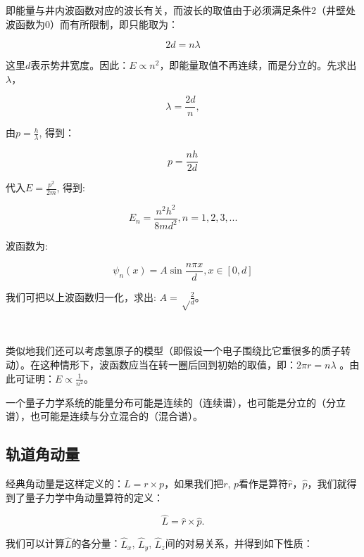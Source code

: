 即能量与井内波函数对应的波长有关，而波长的取值由于必须满足条件2（井壁处波函数为0）而有所限制，即只能取为：

\begin{equation}
2d = n \lambda
\end{equation}

这里$d$表示势井宽度。因此：$E \propto n^2$，即能量取值不再连续，而是分立的。先求出$\lambda$，

\begin{equation}
\lambda = \frac{2d}{n},
\end{equation}

由$p =\frac{h}{\lambda}$, 得到：

\begin{equation}
p = \frac{nh}{2d}
\end{equation}

代入$E = \frac{p^2}{2m}$, 得到:

\begin{equation}
E_n = \frac{n^2 h^2}{8m d^2}, n=1,2,3,...
\end{equation}

波函数为:

\begin{equation}\label{wave functions for 1d infinite well}
\psi_n (x) = A \sin \frac{n \pi x}{d}, x \in [0,d]
\end{equation}

我们可把以上波函数归一化，求出: $A= \sqrt \frac{2}{d}$。


~

类似地我们还可以考虑氢原子的模型（即假设一个电子围绕比它重很多的质子转动）。在这种情形下，波函数应当在转一圈后回到初始的取值，即：$2 \pi r = n \lambda$ 。由此可证明：$E \propto \frac{1}{n^2}$。

一个量子力学系统的能量分布可能是连续的（连续谱），也可能是分立的（分立谱），也可能是连续与分立混合的（混合谱）。

\subsection{轨道角动量}

经典角动量是这样定义的：$L = r \times p$，如果我们把$r$,
$p$看作是算符$\hat r$，$\hat p$，我们就得到了量子力学中角动量算符的定义：

\begin{equation}
\hat L = \hat r \times \hat p .
\end{equation}

我们可以计算$\hat L$的各分量：$\hat L_x$, $\hat L_y$, $\hat L_z$间的对易关系，并得到如下性质：

